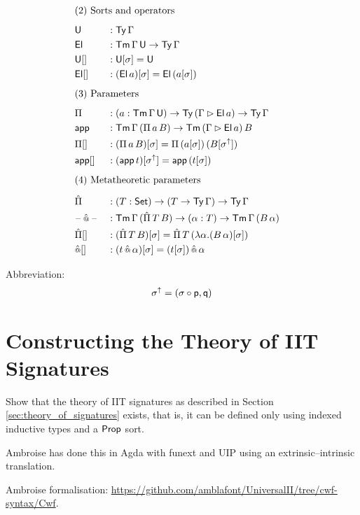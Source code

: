 \documentclass[a4paper,UKenglish,cleveref, autoref]{lipics-v2019}
\begin{document}
\begin{alignat*}{5}
  & \rlap{(2) Sorts and operators} \\[0.5em]
  & \U && : \Ty\,\Gamma \\
  & \El && : \Tm\,\Gamma\,\U\ra\Ty\,\Gamma \\
  & {\U[]} && : \U[\sigma] = \U \\
  & {\El[]} && : (\El\,a)[\sigma] = \El\,(a[\sigma]) \\[0.5em]
  & \rlap{(3) Parameters} \\[0.5em]
  & \Pi && : (a:\Tm\,\Gamma\,\U)\ra\Ty\,(\Gamma\ext\El\,a)\ra\Ty\,\Gamma \\
  & \app && : \Tm\,\Gamma\,(\Pi\,a\,B)\ra\Tm\,(\Gamma\ext \El\,a)\,B \\
  & {\Pi[]} && : (\Pi\,a\,B)[\sigma] = \Pi\,(a[\sigma])\,(B[\sigma^\uparrow]) \\
  & {\app[]} && : (\app\,t)[\sigma^\uparrow] = \app\,(t[\sigma]) \\[0.5em]
  & \rlap{(4) Metatheoretic parameters} \\[0.5em]
  & \Pim && : (T:\Set)\ra(T\ra\Ty\,\Gamma)\ra\Ty\,\Gamma \\
  & \blank\appm \blank && : \Tm\,\Gamma\,(\Pim\,T\,B)\ra(\alpha:T) \ra\Tm\,\Gamma\,(B\,\alpha) \\
  & {\Pim[]} && : (\Pim\,T\,B)[\sigma] = \Pim\,T\,(\lambda \alpha.(B\,\alpha)[\sigma]) \\
  & {\appm[]} && : (t\appm\alpha)[\sigma] = (t[\sigma])\mathop{\appm}\alpha \\[0.5em]
\end{alignat*}
Abbreviation:
\[
  \sigma^\uparrow = (\sigma\circ\mathsf{p},\mathsf{q})
\]



\section{Constructing the Theory of IIT Signatures}
\label{sec:ambroise}


Show that the theory of IIT signatures as described in Section
\ref{sec:theory_of_signatures} exists, that is, it can be defined only
using indexed inductive types and a $\mathsf{Prop}$ sort.

Ambroise has done this in Agda with funext and UIP using an
extrinsic--intrinsic translation.

Ambroise formalisation: \url{https://github.com/amblafont/UniversalII/tree/cwf-syntax/Cwf}.
\end{document}
